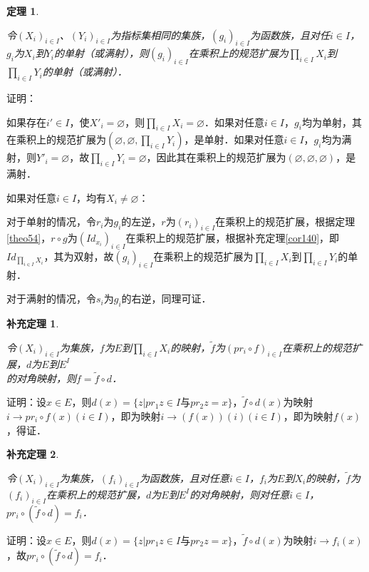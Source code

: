 \documentclass[12pt, a4paper, oneside]{book}
\newtheorem{theo}{定理}
\newtheorem{cor}{补充定理}
\begin{document}
			\begin{theo}\label{theo55}
				\hfill\par
				令$(X_i)_{i\in I}$、$(Y_i)_{i\in I}$为指标集相同的集族，$(g_i)_{i\in I}$为函数族，且对任$i\in I$，$g_i$为$X_i$到$Y_i$的单射（或满射），则$(g_i)_{i\in I}$在乘积上的规范扩展为$\prod\limits_{i\in I}X_i$到$\prod\limits_{i\in I}Y_i$的单射（或满射）．
			\end{theo}
			证明：
			\par
			如果存在$i'\in I$，使${X'}_i=\varnothing$，则$\prod\limits_{i\in I}X_i=\varnothing$．如果对任意$i\in I$，$g_i$均为单射，其在乘积上的规范扩展为$(\varnothing, \varnothing, \prod\limits_{i\in I}Y_i)$，是单射．如果对任意$i\in I$，$g_i$均为满射，则${Y'}_i=\varnothing$，故$\prod\limits_{i\in I}Y_i=\varnothing$，因此其在乘积上的规范扩展为$(\varnothing, \varnothing, \varnothing)$，是满射．
			\par
			如果对任意$i\in I$，均有$X_i\neq \varnothing$：
			\par
			对于单射的情况，令$r_i$为$g_i$的左逆，$r$为$(r_i)_{i\in I}$在乘积上的规范扩展，根据定理\ref{theo54}，$r\circ g$为$(Id_{x_i})_{i\in I}$在乘积上的规范扩展，根据补充定理\ref{cor140}，即$Id_{\prod\limits_{i\in I}X_i}$，其为双射，故$(g_i)_{i\in I}$在乘积上的规范扩展为$\prod\limits_{i\in I}X_i$到$\prod\limits_{i\in I}Y_i$的单射．
			\par
			对于满射的情况，令$s_i$为$g_i$的右逆，同理可证．
						
			\begin{cor}\label{cor142}
				\hfill\par
				令$(X_i)_{i\in I}$为集族，$f$为$E$到$\prod\limits_{i\in I}X_i$的映射，$\tilde{f}$为$(pr_i\circ f)_{i\in I}$在乘积上的规范扩展，$d$为$E$到$E^I$\\的对角映射，则$f=\tilde{f}\circ d$．
			\end{cor}
			证明：设$x\in E$，则$d(x)=\{z|pr_1z\in I\text{与}pr_2z=x\}$，$\tilde{f}\circ d(x)$为映射$i\to pr_i\circ f(x)(i\in I)$，即为映射$i\to (f(x))(i)(i\in I)$，即为映射$f(x)$，得证．
			
			\begin{cor}\label{cor143}
				\hfill\par
				令$(X_i)_{i\in I}$为集族，$(f_i)_{i\in I}$为函数族，且对任意$i\in I$，$f_i$为$E$到$X_i$的映射，$\tilde{f}$为$(f_i)_{i\in I}$在乘积上的规范扩展，$d$为$E$到$E^I$的对角映射，则对任意$i\in I$，$pr_i\circ (\tilde{f}\circ d)=f_i$．
			\end{cor}
			证明：设$x\in E$，则$d(x) =\{z|pr_1z\in I\text{与}pr_2z=x\}$，$\tilde{f}\circ d(x)$为映射$i\to f_i(x)$，故$pr_i\circ (\tilde{f}\circ d)=f_i$．
			
\end{document}
